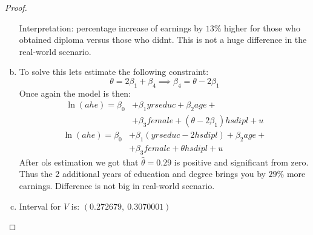 \documentclass[12pt,reqno]{amsart}
\theoremstyle{plain}
\begin{document}
\begin{proof}
\begin{enumerate}[(a)]
              Interpretation: percentage increase of earnings by $ 13\% $ higher for those who
              obtained diploma versus those who didnt. This is not a huge difference in the real-world
              scenario.
        \item To solve this lets estimate the following constraint:
              \[\theta = 2\beta_1 + \beta_4 \implies \beta_4 = \theta - 2\beta_1\]
              Once again the model is then:
              \begin{align*}
                  \ln(ahe) = \beta_0 & + \beta_1 yrseduc + \beta_2 age +                  \\
                                     & + \beta_3 female + (\theta - 2 \beta_1)hsdipl  + u
              \end{align*}
              \begin{align*}
                  \ln(ahe) = \beta_0 & + \beta_1 (yrseduc - 2 hsdipl) + \beta_2 age + \\
                                     & +\beta_3 female + \theta hsdipl + u
              \end{align*}
              After ols estimation we got that $ \hat\theta =0.29$ is positive and significant from zero.
              Thus the 2 additional years of education and degree brings you by $ 29\% $ more earnings.
              Difference is not big in real-world scenario.
        \item Interval for $ V $ is: $ (0.272679, ~ 0.3070001) $
    \end{enumerate}
\end{proof}
\end{document}
